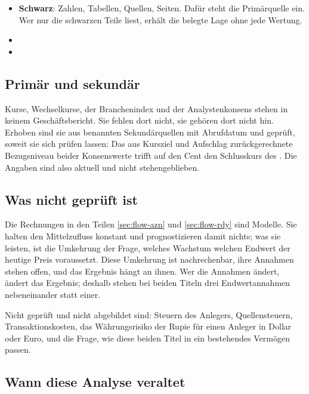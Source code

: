 \begin{itemize}
\item \textbf{Schwarz}: Zahlen, Tabellen, Quellen, Seiten. Daf\"ur steht die
Prim\"arquelle ein. Wer nur die schwarzen Teile liest, erh\"alt die belegte
Lage ohne jede Wertung.
\item {}
\item {}
\end{itemize}

\subsection*{Prim\"ar und sekund\"ar}

Kurse, Wechselkurse, der Branchenindex und der Analystenkonsens stehen in
keinem Gesch\"aftsbericht. Sie fehlen dort nicht, sie geh\"oren dort nicht
hin. Erhoben sind sie aus benannten Sekund\"arquellen mit Abrufdatum und
gepr\"uft, soweit sie sich pr\"ufen lassen: Das aus Kursziel und Aufschlag
zur\"uckgerechnete Bezugsniveau beider Konsenswerte trifft auf den Cent den
Schlusskurs des \Datum{\AznKursTag}. Die Angaben sind also aktuell und nicht
stehengeblieben.

\subsection*{Was nicht gepr\"uft ist}

Die Rechnungen in den Teilen \ref{sec:flow-azn} und \ref{sec:flow-rdy} sind
Modelle. Sie halten den Mittelzufluss konstant und prognostizieren damit
nichts; was sie leisten, ist die Umkehrung der Frage, welches Wachstum
welchen Endwert der heutige Preis voraussetzt. Diese Umkehrung ist nachrechenbar,
ihre Annahmen stehen offen, und das Ergebnis h\"angt an ihnen. Wer die
Annahmen \"andert, \"andert das Ergebnis; deshalb stehen bei beiden Titeln
drei Endwertannahmen nebeneinander statt einer.

Nicht gepr\"uft und nicht abgebildet sind: Steuern des Anlegers,
Quellensteuern, Transaktionskosten, das W\"ahrungsrisiko der Rupie f\"ur
einen Anleger in Dollar oder Euro, und die Frage, wie diese beiden Titel in
ein bestehendes Verm\"ogen passen.

\subsection*{Wann diese Analyse veraltet}

